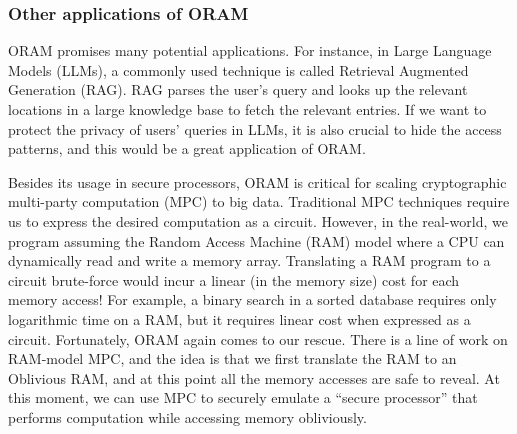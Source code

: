 \subsubsection{Other applications of
ORAM}\label{other-applications-of-oram}

ORAM promises many potential applications. For instance, in Large
Language Models (LLMs), a commonly used technique is called Retrieval
Augmented Generation (RAG). RAG parses the user's query and looks up the
relevant locations in a large knowledge base to fetch the relevant
entries. If we want to protect the privacy of users' queries in LLMs, it
is also crucial to hide the access patterns, and this would be a great
application of ORAM.

Besides its usage in secure processors, ORAM is critical for scaling
cryptographic multi-party computation (MPC) to big data. Traditional MPC
techniques require us to express the desired computation as a circuit.
However, in the real-world, we program assuming the Random Access
Machine (RAM) model where a CPU can dynamically read and write a memory
array. Translating a RAM program to a circuit brute-force would incur a
linear (in the memory size) cost for each memory access! For example, a
binary search in a sorted database requires only logarithmic time on a
RAM, but it requires linear cost when expressed as a circuit.
Fortunately, ORAM again comes to our rescue. There is a line of work on
RAM-model MPC, and the idea is that we first translate the RAM to an
Oblivious RAM, and at this point all the memory accesses are safe to
reveal. At this moment, we can use MPC to securely emulate a ``secure
processor'' that performs computation while accessing memory
obliviously.
